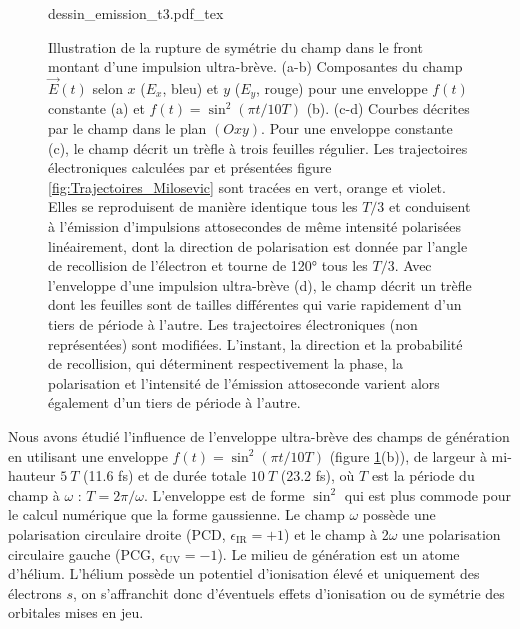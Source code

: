 \begin{figure}
\centering
\def\svgwidth{\textwidth}
{dessin_emission_t3.pdf_tex}
\caption{Illustration de la rupture de symétrie du champ dans le front montant d'une impulsion ultra-brève. (a-b) Composantes du champ $\vec{E}(t)$ selon $x$ ($E_x$, bleu) et $y$ ($E_y$, rouge) pour une enveloppe  $f(t)$ constante (a) et $f(t) = \sin^2 (\pi t / 10 T)$ (b). (c-d) Courbes décrites par le champ dans le plan $(Oxy)$. Pour une enveloppe constante (c), le champ décrit un trèfle à trois feuilles régulier. Les trajectoires électroniques calculées par  et présentées figure \ref{fig:Trajectoires_Milosevic} sont tracées en vert, orange et violet. Elles se reproduisent de manière identique tous les $T/3$ et conduisent à l'émission d'impulsions attosecondes de même intensité polarisées linéairement, dont la direction de polarisation est donnée par l'angle de recollision de l'électron et tourne de 120° tous les $T/3$. Avec l'enveloppe d'une impulsion ultra-brève (d), le champ décrit un trèfle dont les feuilles sont de tailles différentes qui varie rapidement d'un tiers de période à l'autre. Les trajectoires électroniques (non représentées) sont modifiées. L'instant, la direction et la probabilité de recollision, qui déterminent respectivement la phase, la polarisation et l'intensité de l'émission attoseconde varient alors également d'un tiers de période à l'autre.}
\label{fig:dessin_emission_t3}
\end{figure}

Nous avons étudié l'influence de l'enveloppe ultra-brève des champs de génération en utilisant une enveloppe $f(t) = \sin^2 (\pi t / 10 T)$ (figure \ref{fig:dessin_emission_t3}(b)), de largeur à mi-hauteur $5 \: T$ (11.6 fs) et de durée totale $10 \: T$ (23.2 fs), où $T$ est la période du champ à $\omega$ : $T = 2\pi/\omega$. L'enveloppe est de forme $\sin^2$ qui est plus commode pour le calcul numérique que la forme gaussienne. Le champ $\omega$ possède une polarisation circulaire droite (PCD, $\epsilon_{\text{IR}} = +1$) et le champ à 2$\omega$ une polarisation circulaire gauche (PCG,  $\epsilon_{\text{UV}} = -1$). Le milieu de génération est un atome d'hélium. L'hélium possède un potentiel d'ionisation élevé et uniquement des électrons $s$, on s'affranchit donc d'éventuels effets d'ionisation ou de symétrie des orbitales mises en jeu.

